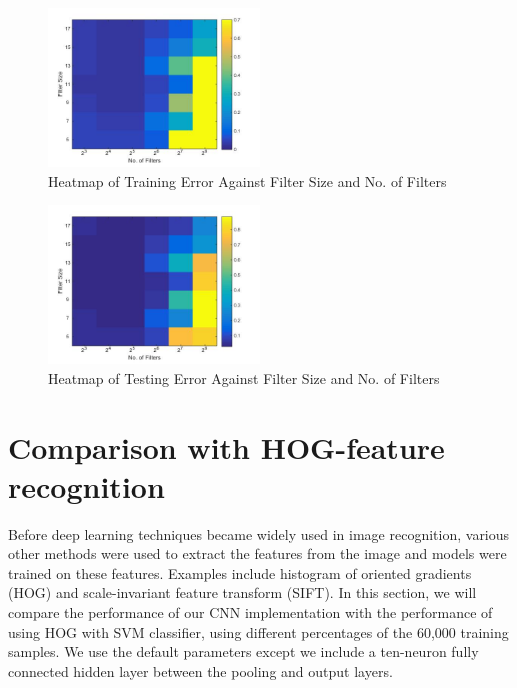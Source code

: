 \documentclass[10pt,twocolumn]{article}
\begin{document}
\begin{figure}
\centering
\includegraphics[width = 0.5\textwidth]{figure/fs_fc_train_heatmap}
\caption{Heatmap of Training Error Against Filter Size and No. of Filters}
\label{fig:fs_fc_train_heatmap}
\end{figure}

\begin{figure}
\centering
\includegraphics[width = 0.5\textwidth]{figure/fs_fc_test_heatmap}
\caption{Heatmap of Testing Error Against Filter Size and No. of Filters}
\label{fig:fs_fc_test_heatmap}
\end{figure}

\section{Comparison with HOG-feature recognition} \label{sec:evalfeature}

Before deep learning techniques became widely used in image recognition, various other methods were used to extract the features from the image and models were trained on these features. Examples include histogram of oriented gradients (HOG) and scale-invariant feature transform (SIFT). In this section, we will compare the performance of our CNN implementation with the performance of using HOG with SVM classifier, using different percentages of the 60,000 training samples. We use the default parameters except we include a ten-neuron fully connected hidden layer between the pooling and output layers.
\end{document}
